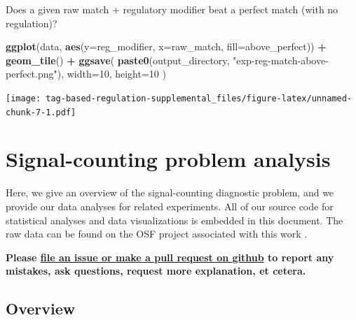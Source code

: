 \documentclass[]{book}
\newenvironment{Shaded}{\begin{snugshade}}{\end{snugshade}}
\newcommand{\DataTypeTok}[1]{\textcolor[rgb]{0.13,0.29,0.53}{#1}}
\newcommand{\DecValTok}[1]{\textcolor[rgb]{0.00,0.00,0.81}{#1}}
\newcommand{\KeywordTok}[1]{\textcolor[rgb]{0.13,0.29,0.53}{\textbf{#1}}}
\newcommand{\NormalTok}[1]{#1}
\newcommand{\OperatorTok}[1]{\textcolor[rgb]{0.81,0.36,0.00}{\textbf{#1}}}
\newcommand{\StringTok}[1]{\textcolor[rgb]{0.31,0.60,0.02}{#1}}
\begin{document}
Does a given raw match + regulatory modifier beat a perfect match (with no regulation)?

\begin{Shaded}
\begin{Highlighting}[]
\KeywordTok{ggplot}\NormalTok{(data, }\KeywordTok{aes}\NormalTok{(}\DataTypeTok{y=}\NormalTok{reg_modifier, }\DataTypeTok{x=}\NormalTok{raw_match, }\DataTypeTok{fill=}\NormalTok{above_perfect)) }\OperatorTok{+}
\StringTok{  }\KeywordTok{geom_tile}\NormalTok{() }\OperatorTok{+}
\StringTok{  }\KeywordTok{ggsave}\NormalTok{(}
    \KeywordTok{paste0}\NormalTok{(output_directory, }\StringTok{"exp-reg-match-above-perfect.png"}\NormalTok{),}
    \DataTypeTok{width=}\DecValTok{10}\NormalTok{,}
    \DataTypeTok{height=}\DecValTok{10}
\NormalTok{  )}
\end{Highlighting}
\end{Shaded}

\texttt{[image: tag-based-regulation-supplemental\_files/figure-latex/unnamed-chunk-7-1.pdf]}

\hypertarget{signal-counting-problem-analysis}{%
\chapter{Signal-counting problem analysis}\label{signal-counting-problem-analysis}}

Here, we give an overview of the signal-counting diagnostic problem, and we provide our data analyses for related experiments.
All of our source code for statistical analyses and data visualizations is embedded in this document.
The raw data can be found on the OSF project associated with this work \citep{Lalejini_Moreno_Ofria_Data_2020}.

\textbf{Please \href{https://github.com/amlalejini/Tag-based-Genetic-Regulation-for-LinearGP/issues}{file an issue or make a pull request on github} to report any mistakes, ask questions, request more explanation, et cetera.}

\hypertarget{overview}{%
\section{Overview}\label{overview}}
\end{document}
